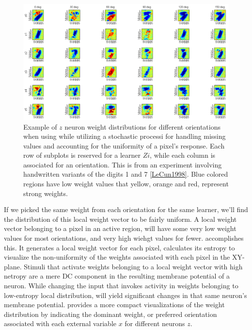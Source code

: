 \documentclass{report}
\begin{document}
\begin{figure}[ht]
\centering
\includegraphics[width=1.2\textwidth]{weightsPerOrientation}
\caption{Example of $z$ neuron weight distributions for different orientations when using while utilizing a stochastic processi for handling missing values and accounting for the uniformity of a pixel's response. Each row of subplots is reserved for a learner $Zi$, while each column is associated for an orientation. This is from an experiment involving handwritten variants of the digits 1 and 7 \cref{LeCun1998}. Blue colored regions have low weight values that yellow, orange and red, represent strong weights.
\label{fig:weightsPerOrientation}}
\end{figure}

If we picked the same weight from each orientation for the same learner, we'll find the distribution of this local weight vector to be fairly uniform. A local weight vector belonging to a pixel in an active region, will have some very low weight values for most orientations, and very high wiehgt values for fewer.  accomplishes this. It generates a local weight vector for each pixel, calculates its entropy to visualize the non-uniformity of the weights associated with each pixel in the XY-plane. Stimuli that activate weights belonging to a local weight vector with high netropy are a mere DC component in the resulting membrane potential of a neuron. While changing the input that invokes activity in weights belonging to low-entropy local distribution, will yield significant changes in that same neuron's membrane potential.  provides a more compact visualizations of the weight distribution by indicating the dominant weight, or preferred orientation associated with each external variable $x$ for different neurons $z$.
\end{document}
